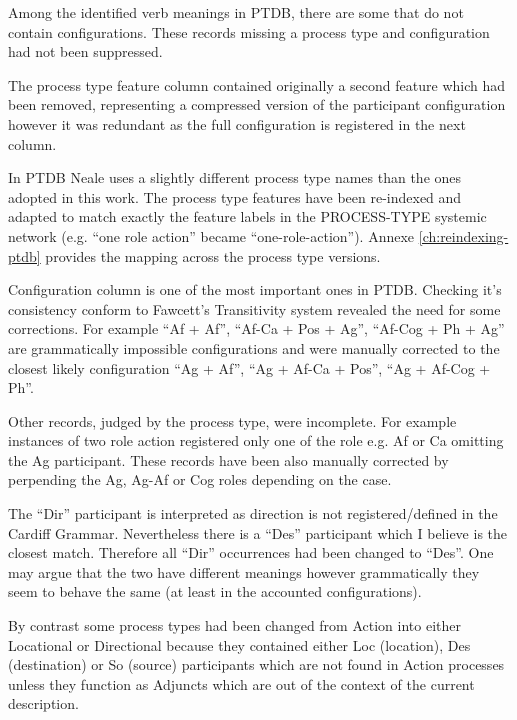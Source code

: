 
Among the identified verb meanings in PTDB, there are some that do not contain configurations. These records missing a process type and configuration had not been suppressed. 

The process type feature column contained originally a second feature which had been removed, representing a compressed version of the participant configuration however it was redundant as the full configuration is registered in the next column. 

In PTDB Neale uses a slightly different process type names than the ones adopted in this work. The process type features have been re-indexed and adapted to match exactly the feature labels in the PROCESS-TYPE systemic network (e.g. ``one role action'' became ``one-role-action''). Annexe \ref{ch:reindexing-ptdb} provides the mapping across the process type versions. 

Configuration column is one of the most important ones in PTDB. Checking it's consistency conform to Fawcett's Transitivity system revealed the need for some corrections. For example ``Af + Af'', ``Af-Ca + Pos + Ag'', ``Af-Cog + Ph + Ag'' are grammatically impossible configurations and were manually corrected to the closest likely configuration ``Ag + Af'', ``Ag + Af-Ca + Pos'', ``Ag + Af-Cog + Ph''.

Other records, judged by the process type, were incomplete. For example instances of two role action registered only one of the role e.g. Af or Ca omitting the Ag participant. These records have been also manually corrected by perpending the Ag, Ag-Af or Cog roles depending on the case. 

The ``Dir'' participant is interpreted as direction is not registered/defined in the Cardiff Grammar. Nevertheless there is a ``Des'' participant which I believe is the closest match. Therefore all ``Dir'' occurrences had been changed to ``Des''. One may argue that the two have different meanings however grammatically they seem to behave the same (at least in the accounted configurations). 

By contrast some process types had been changed from Action into either Locational or Directional because they contained either Loc (location), Des (destination) or So (source) participants which are not found in Action processes unless they function as Adjuncts which are out of the context of the current description.

